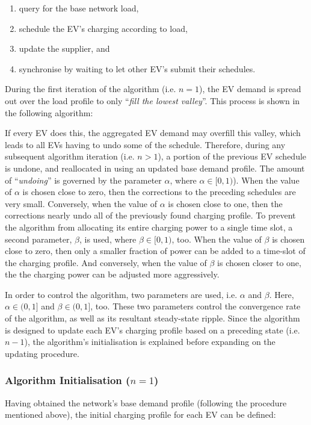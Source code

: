 \begin{enumerate}
	\item query for the base network load,
	\item schedule the EV's charging according to load,
	\item update the supplier, and
	\item synchronise by waiting to let other EV's submit their schedules.
\end{enumerate}

During the first iteration of the algorithm (i.e. $n=1$), the EV demand is spread out over the load profile to only ``\textit{fill the lowest valley}''.
This process is shown in the following algorithm:



If every EV does this, the aggregated EV demand may overfill this valley, which leads to all EVs having to undo some of the schedule.
Therefore, during any subsequent algorithm iteration (i.e. $n>1$), a portion of the previous EV schedule is undone, and reallocated in using an updated base demand profile.
The amount of ``\textit{undoing}'' is governed by the parameter $\alpha$, where $\alpha \in [0, 1)$).
When the value of $\alpha$ is chosen close to zero, then the corrections to the preceding schedules are very small.
Conversely, when the value of $\alpha$ is chosen close to one, then the corrections nearly undo all of the previously found charging profile.
To prevent the algorithm from allocating its entire charging power to a single time slot, a second parameter, $\beta$, is used, where $\beta \in [0, 1)$, too.
When the value of $\beta$ is chosen close to zero, then only a smaller fraction of power can be added to a time-slot of the charging profile.
And conversely, when the value of $\beta$ is chosen closer to one, the the charging power can be adjusted more aggressively.



In order to control the algorithm, two parameters are used, i.e. $\alpha$ and $\beta$.
Here, $\alpha \in (0, 1]$ and $\beta \in (0, 1]$, too.
These two parameters control the convergence rate of the algorithm, as well as its resultant steady-state ripple.
Since the algorithm is designed to update each EV's charging profile based on a preceding state (i.e. $n-1$), the algorithm's initialisation is explained before expanding on the updating procedure.

\subsubsection{Algorithm Initialisation ($n=1$)}

Having obtained the network's base demand profile (following the procedure mentioned above), the initial charging profile for each EV can be defined:














